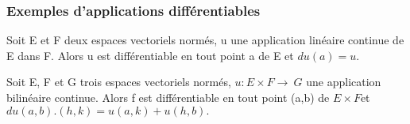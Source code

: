 \subsubsection{Exemples d'applications différentiables}
%
\begin{prop}
  Soit E et F deux espaces vectoriels normés, u une
  application linéaire continue de E dans F. Alors u est différentiable en
  tout point a de E et $du(a) = u$.
\end{prop}
%
\begin{prop}
  Soit E, F et G trois espaces vectoriels normés, $u : E
  \times F \rightarrow~ G $ une application bilinéaire continue. Alors f est différentiable
  en tout point (a,b) de $E \times F $et $du(a,b).(h,k) = u(a,k) + u(h,b).$
%
\end{prop}
%
%
